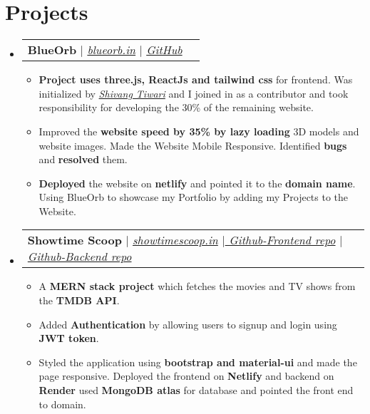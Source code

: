 \documentclass[letterpaper,11pt]{article}
\makeatletter
\newcommand{\resumeItem}[1]{
  \item\small{
    {#1 \vspace{-2pt}}
  }
}
\newcommand{\resumeProjectHeading}[2]{
    \vspace{-2pt}\item
    \begin{tabular*}{0.97\textwidth}{l@{\extracolsep{\fill}}r}
      \small#1 & #2 \\
    \end{tabular*}\vspace{-7pt}
}
\newcommand{\resumeSubHeadingListStart}{\begin{itemize}[leftmargin=0.15in, label={}]}
\newcommand{\resumeSubHeadingListEnd}{\end{itemize}}
\newcommand{\resumeItemListStart}{\begin{itemize}}
\newcommand{\resumeItemListEnd}{\end{itemize}\vspace{-5pt}}
\makeatother
\begin{document}
    


\section{Projects}
    \vspace{3pt}
    \resumeSubHeadingListStart
      
      \resumeProjectHeading
        {\textbf{BlueOrb} $|$ \emph{\href{https://blueorb.in}{\color{blue} blueorb.in}} $|$ \emph{\href{https://github.com/Akash-152000/BlueOrb}{\color{blue}GitHub}}}{}
          \resumeItemListStart
            \resumeItem{\textbf{Project uses three.js, ReactJs and tailwind css} for frontend. Was initialized by \emph{\href{https://github.com/joelj7011}{\color{blue}Shivang Tiwari}} and I joined in as a contributor and took responsibility for developing the 30\% of the remaining website.}
            \resumeItem{Improved the \textbf{website speed by 35\% by lazy loading}  3D models and website images. Made the Website Mobile Responsive. Identified \textbf{bugs} and \textbf{resolved} them.}
            \resumeItem{\textbf{Deployed} the website on \textbf{netlify} and pointed it to the \textbf{domain name}. Using BlueOrb to showcase my Portfolio by adding my Projects to the Website.}
          \resumeItemListEnd

      
      \resumeProjectHeading
        {\textbf{Showtime Scoop} $|$ \emph{\href{https://showtimescoop.in}{\color{blue} showtimescoop.in}} $|$\emph{\href{https://github.com/Akash-152000/Showtime-Scoop}{\color{blue} Github-Frontend repo}} $|$ \emph{\href{https://github.com/Akash-152000/Server-ShowtimeScoop-}{\color{blue}Github-Backend repo}}}{}
          \resumeItemListStart
            \resumeItem{A \textbf{MERN stack project} which fetches the movies and TV shows from the \textbf{TMDB API}.}
            \resumeItem{Added \textbf{Authentication} by allowing users to signup and login using \textbf{JWT token}.}
            \resumeItem{Styled the application using \textbf{bootstrap and material-ui} and made the page responsive. Deployed the frontend on \textbf{Netlify} and backend on \textbf{Render} used \textbf{MongoDB atlas} for database and pointed the front end to domain.}
          \resumeItemListEnd
      
    \resumeSubHeadingListEnd



\end{document}
